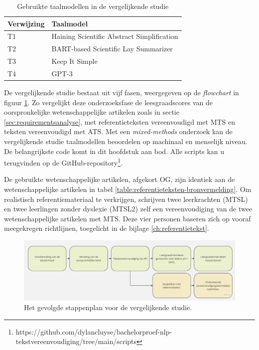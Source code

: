 \begin{center}
	\begin{table}[H]
		\begin{tabular}{ | m{4cm} | m{11cm} | } 
			\hline
			\textbf{Verwijzing} & \textbf{Taalmodel} \\
			\hline
			T1 & Haining Scientific Abstract Simplification \\
			\hline
			T2 & BART-based Scientific Lay Summarizer \\
			\hline
			T3 & Keep It Simple\\
			\hline
			T4 & GPT-3 \\
			\hline
		\end{tabular}
		\caption{Gebruikte taalmodellen in de vergelijkende studie}
		\label{table:vergelijkende-studie-taalmodellen}
	\end{table}
\end{center}

De vergelijkende studie bestaat uit vijf fasen, weergegeven op de \textit{flowchart} in figuur \ref{img:flowchart-vergelijkende-studie-metrics}. Zo vergelijkt deze onderzoeksfase de leesgraadscores van de oorspronkelijke wetenschappelijke artikelen zoals in sectie \ref{sec:requirementsanalyse}, met referentieteksten vereenvoudigd met MTS en teksten vereenvoudigd met ATS. Met een \textit{mixed-methods} onderzoek kan de vergelijkende studie taalmodellen beoordelen op machinaal en menselijk niveau. De belangrijkste code komt in dit hoofdstuk aan bod. Alle scripts kan u terugvinden op de GitHub-repository\footnote{https://github.com/dylancluyse/bachelorproef-nlp-tekstvereenvoudiging/tree/main/scripts}.

\medspace

De gebruikte wetenschappelijke artikelen, afgekort OG, zijn identiek aan de wetenschappelijke artikelen in tabel \ref{table:referentieteksten-bronvermelding}. Om realistisch referentiemateriaal te verkrijgen, schrijven twee leerkrachten (MTSL) en twee leerlingen zonder dyslexie (MTSL2) zelf een vereenvoudiging van de twee wetenschappelijke artikelen met MTS. Deze vier personen baseren zich op vooraf meegekregen richtlijnen, toegelicht in de bijlage \ref{ch:referentietekst}. 

\begin{figure}
\includegraphics[width=\linewidth]{img/flowchart-vergelijkende-studie.jpg}
\caption{Het gevolgde stappenplan voor de vergelijkende studie.}
\label{img:flowchart-vergelijkende-studie-metrics}
\end{figure}


